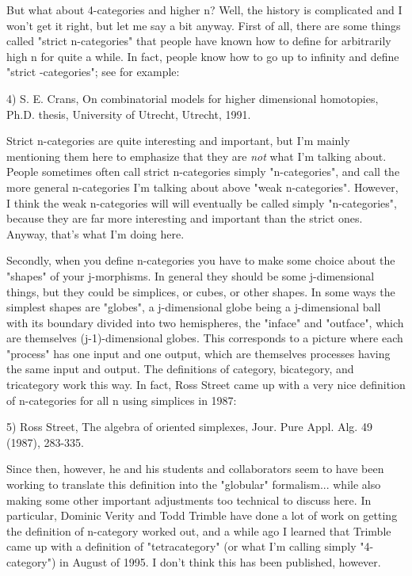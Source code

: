 But what about 4-categories and higher n?  Well, the history is
complicated and I won't get it right, but let me say a bit anyway.
First of all, there are some things called "strict n-categories" that
people have known how to define for arbitrarily high n for quite a
while.  In fact, people know how to go up to infinity and define
"strict \omega -categories"; see for example:

4) S. E. Crans, On combinatorial models for higher dimensional
homotopies, Ph.D. thesis, University of Utrecht, Utrecht, 1991.

Strict n-categories are quite interesting and important, but I'm
mainly mentioning them here to emphasize that they are \emph{not} what I'm
talking about.  People sometimes often call strict n-categories simply
"n-categories", and call the more general n-categories I'm talking
about above "weak n-categories".  However, I think the weak
n-categories will will eventually be called simply "n-categories",
because they are far more interesting and important than the strict
ones.  Anyway, that's what I'm doing here.

Secondly, when you define n-categories you have to make some choice
about the "shapes" of your j-morphisms.  In general they should be
some j-dimensional things, but they could be simplices, or cubes, or
other shapes.  In some ways the simplest shapes are "globes", a
j-dimensional globe being a j-dimensional ball with its boundary
divided into two hemispheres, the "inface" and "outface", which are
themselves (j-1)-dimensional globes.  This corresponds to a picture
where each "process" has one input and one output, which are themselves
processes having the same input and output.   The definitions of
category, bicategory, and tricategory work this way.  In fact, Ross
Street came up with a very nice definition of n-categories for all n
using simplices in 1987:

5) Ross Street, The algebra of oriented simplexes, Jour. Pure
Appl. Alg. 49 (1987), 283-335.

Since then, however, he and his students and collaborators seem to
have been working to translate this definition into the "globular"
formalism... while also making some other important adjustments too
technical to discuss here.  In particular, Dominic Verity and Todd
Trimble have done a lot of work on getting the definition of
n-category worked out, and a while ago I learned that Trimble came up
with a definition of "tetracategory" (or what I'm calling simply
"4-category") in August of 1995.  I don't think this has been
published, however.

